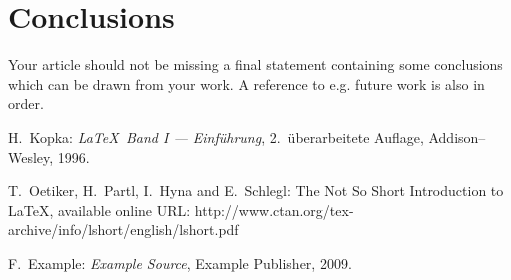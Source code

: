 \documentclass[12pt,a4paper,notitlepage,twoside,headsepline]{scrartcl}
\begin{document}
\section{Conclusions}
Your article should not be missing a final statement containing some conclusions which can be drawn from your work. A reference to e.g. future work is also in order.

\begin{thebibliography}{my bib}

H.\ Kopka: {\em \LaTeX\, Band I --- Einf{\"u}hrung}, 2.\ {\"u}berarbeitete Auflage,
    Addison--Wesley, 1996.
    
T.~Oetiker, H.~Partl, I.~Hyna and E.~Schlegl: The Not So Short Introduction to \LaTeX, available online
URL: http://www.ctan.org/tex-archive/info/lshort/english/lshort.pdf    

F.\ Example: {\em Example Source}, Example Publisher, 2009.

\end{thebibliography}



\end{document}
